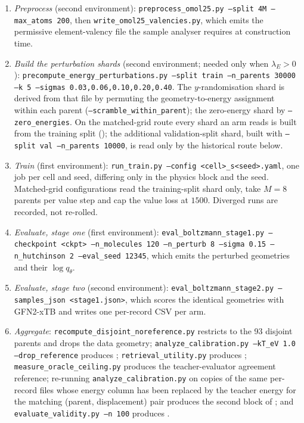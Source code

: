 \begin{enumerate}\itemsep1pt
\item \emph{Preprocess} (second environment): \texttt{preprocess\_omol25.py --split 4M
--max\_atoms 200}, then \texttt{write\_omol25\_valencies.py}, which emits the permissive
element-valency file the sample analyser requires at construction time.
\item \emph{Build the perturbation shards} (second environment; needed only when
$\lambda_E > 0$): \texttt{precompute\_energy\_perturbations.py --split train --n\_parents
30000 --k 5 --sigmas 0.03,0.06,0.10,0.20,0.40}. The $y$-randomisation shard is derived from
that file by permuting the geometry-to-energy assignment within each parent
(\texttt{--scramble\_within\_parent}); the zero-energy shard by
\texttt{--zero\_energies}. On the matched-grid route every shard an arm reads is built from
the training split (); the additional validation-split shard, built with
\texttt{--split val --n\_parents 10000}, is read only by the historical route below.
\item \emph{Train} (first environment): \texttt{run\_train.py --config <cell>\_s<seed>.yaml},
one job per cell and seed, differing only in the physics block and the seed. Matched-grid
configurations read the training-split shard only, take $M = 8$ parents per value step and cap
the value loss at $1500$. Diverged runs are recorded, not re-rolled.
\item \emph{Evaluate, stage one} (first environment): \texttt{eval\_boltzmann\_stage1.py
--checkpoint <ckpt> --n\_molecules 120 --n\_perturb 8 --sigma 0.15
--n\_hutchinson 2 --eval\_seed 12345}, which emits the perturbed geometries and their
$\log q_\theta$.
\item \emph{Evaluate, stage two} (second environment): \texttt{eval\_boltzmann\_stage2.py
--samples\_json <stage1.json>}, which scores the identical geometries with GFN2-xTB and
writes one per-record CSV per arm.
\item \emph{Aggregate}: \texttt{recompute\_disjoint\_noreference.py} restricts to the 93
disjoint parents and drops the data geometry; \texttt{analyze\_calibration.py --kT\_eV 1.0
--drop\_reference} produces ;
\texttt{retrieval\_utility.py} produces ;
\texttt{measure\_oracle\_ceiling.py} produces the teacher-evaluator agreement reference;
re-running \texttt{analyze\_calibration.py} on copies of the same per-record files whose
energy column has been replaced by the teacher energy for the matching (parent,
displacement) pair produces the second block of ; and
\texttt{evaluate\_validity.py --n 100} produces .
\end{enumerate}

